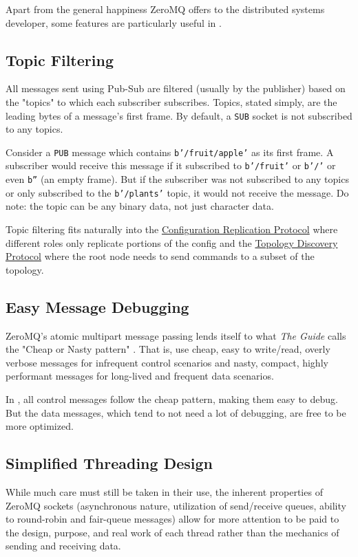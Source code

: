 Apart from the general happiness ZeroMQ offers to the distributed systems developer, some features are particularly
useful in \dcamp.

\subsection{Topic Filtering}

All messages sent using Pub-Sub are filtered (usually by the publisher) based on the "topics" to which each subscriber
subscribes. Topics, stated simply, are the leading bytes of a message's first frame. By default, a \texttt{SUB} socket
is not subscribed to any topics.

Consider a \texttt{PUB} message which contains \texttt{b'/fruit/apple'} as its first frame. A subscriber would receive
this message if it subscribed to \texttt{b'/fruit'} or \texttt{b'/'} or even \texttt{b''} (an empty frame). But if the
subscriber was not subscribed to any topics or only subscribed to the \texttt{b'/plants'} topic, it would not receive
the message. Do note: the topic can be any binary data, not just character data.

Topic filtering fits naturally into the \hyperref[proto_config]{Configuration Replication Protocol} where different
roles only replicate portions of the config and the \hyperref[proto_topo]{Topology Discovery Protocol} where the root
node needs to send commands to a subset of the topology.

\subsection{Easy Message Debugging}

ZeroMQ's atomic multipart message passing lends itself to what \textit{The Guide} calls the "Cheap or Nasty pattern"
\cite{zguide}. That is, use cheap, easy to write/read, overly verbose messages for infrequent control scenarios and
nasty, compact, highly performant messages for long-lived and frequent data scenarios.

In \dcamp, all control messages follow the cheap pattern, making them easy to debug. But the data messages, which tend
to not need a lot of debugging, are free to be more optimized.

\subsection{Simplified Threading Design}

While much care must still be taken in their use, the inherent properties of ZeroMQ sockets (asynchronous nature,
utilization of send/receive queues, ability to round-robin and fair-queue messages) allow for more attention to be paid
to the design, purpose, and real work of each thread rather than the mechanics of sending and receiving data.


